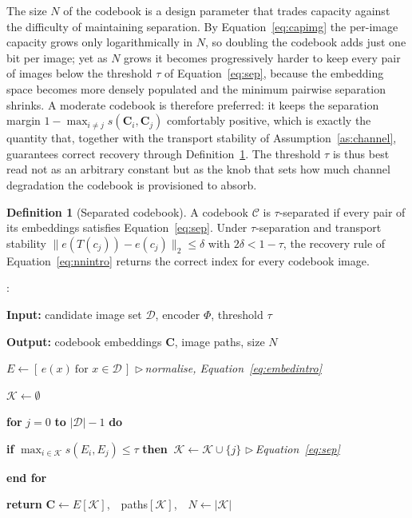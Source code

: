 \documentclass[11pt]{article}
\theoremstyle{definition}
\newtheorem{definition}{Definition}[section]
\newcounter{algln}
\newenvironment{pseudo}{%
  \begin{list}{\footnotesize\arabic{algln}:}{%
    \usecounter{algln}%
    \setlength{\leftmargin}{2.4em}\setlength{\labelwidth}{1.7em}%
    \setlength{\labelsep}{0.4em}\setlength{\itemsep}{1.5pt}%
    \setlength{\parsep}{0pt}\setlength{\topsep}{3pt}\small}%
}{\end{list}}
\newcommand{\kw}[1]{\textbf{#1}}
\newcommand{\Ind}{\hspace*{1.3em}}
\newcommand{\Indd}{\hspace*{2.6em}}
\newcommand{\Cmt}[1]{\hfill{\footnotesize$\triangleright$\,\textit{#1}}}
\newcommand{\Eqn}[1]{Equation~\eqref{#1}}
\begin{document}
The size $N$ of the codebook is a design parameter that trades capacity against the
difficulty of maintaining separation. By \Eqn{eq:capimg} the per-image capacity
grows only logarithmically in $N$, so doubling the codebook adds just one bit per
image; yet as $N$ grows it becomes progressively harder to keep every pair of images
below the threshold $\tau$ of \Eqn{eq:sep}, because the embedding space becomes more
densely populated and the minimum pairwise separation shrinks. A moderate codebook
is therefore preferred: it keeps the separation margin $1-\max_{i\neq j}s(\mathbf{C}
_i,\mathbf{C}_j)$ comfortably positive, which is exactly the quantity that, together
with the transport stability of Assumption~\ref{as:channel}, guarantees correct
recovery through Definition~\ref{def:sep}. The threshold $\tau$ is thus best read
not as an arbitrary constant but as the knob that sets how much channel degradation
the codebook is provisioned to absorb.

\begin{definition}[Separated codebook]\label{def:sep}
A codebook $\mathcal{C}$ is $\tau$-separated if every pair of its embeddings
satisfies \Eqn{eq:sep}. Under $\tau$-separation and transport stability
$\lVert e(T(c_j))-e(c_j)\rVert_2\le\delta$ with $2\delta<1-\tau$, the recovery rule
of \Eqn{eq:nnintro} returns the correct index for every codebook image.
\end{definition}


\begin{algorithm}[t]
\caption{Codebook construction (pre-processing)}\label{alg:codebook}
\begin{pseudo}
\item \kw{Input:} candidate image set $\mathcal{D}$, encoder $\Phi$, threshold $\tau$
\item \kw{Output:} codebook embeddings $\mathbf{C}$, image paths, size $N$
\item $E \gets [\,e(x)\ \text{for } x\in\mathcal{D}\,]$ \Cmt{normalise, \Eqn{eq:embedintro}}
\item $\mathcal{K}\gets\emptyset$
\item \kw{for} $j=0$ \kw{to} $|\mathcal{D}|-1$ \kw{do}
\item \Ind \kw{if} $\max_{i\in\mathcal{K}} s(E_i,E_j)\le\tau$ \kw{then}
           $\ \mathcal{K}\gets\mathcal{K}\cup\{j\}$ \Cmt{\Eqn{eq:sep}}
\item \kw{end for}
\item \kw{return} $\mathbf{C}\gets E[\mathcal{K}]$,\ \ paths$[\mathcal{K}]$,\ \ $N\gets|\mathcal{K}|$
\end{pseudo}
\end{algorithm}
\end{document}
